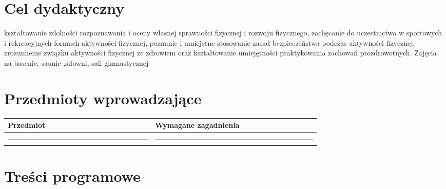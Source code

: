 \documentclass[12pt, a4paper]{article}
\begin{document}
\section{Cel dydaktyczny}

kształtowanie zdolności rozpoznawania i oceny własnej sprawności fizycznej i rozwoju fizycznego, zachęcanie do uczestnictwa w sportowych i rekreacyjnych formach aktywności fizycznej, poznanie i umiejętne stosowanie zasad bezpieczeństwa podczas aktywności fizycznej, zrozumienie związku aktywności fizycznej ze zdrowiem oraz kształtowanie umiejętności praktykowania zachowań prozdrowotnych. Zajęcia na basenie, saunie ,siłowni, sali gimnastycznej

\section{Przedmioty wprowadzające}

\begin{tabularx}{\textwidth}{lX}
  \hline
  \textbf{Przedmiot} & \textbf{Wymagane zagadnienia} \\
  \hline
  ----------------------------------------------------------- & ------------------------------------------------------------------ \\
  \hline
\end{tabularx}

\section{Treści programowe}
\end{document}
